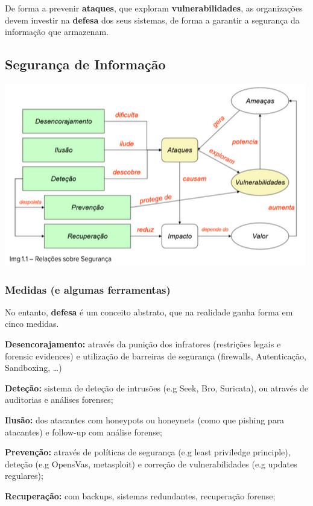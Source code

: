 \documentclass{article}
\begin{document}
  De forma a prevenir \textbf{ataques}, que exploram \textbf{vulnerabilidades}, as organizações devem investir
  na \textbf{defesa} dos seus sistemas, de forma a garantir a segurança da informação que armazenam.

  \vspace{2mm}

  \subsection{Segurança de Informação}

  \begin{center}
    \includegraphics[scale=0.4]{10}
  \end{center}

  \subsubsection{Medidas (e algumas ferramentas)}

  No entanto, \textbf{defesa} é um conceito abstrato, que na realidade ganha forma em cinco medidas.

  \begin{flushleft}
    \textbf{Desencorajamento:} através da punição dos infratores (restrições legais e forensic evidences) e utilização de barreiras de segurança
    (firewalls, Autenticação, Sandboxing, \dots)

    \vspace{2mm}

    \textbf{Deteção:} sistema de deteção de intrusões (e.g Seek, Bro, Suricata), ou através de auditorias e análises forenses;

    \vspace{2mm}

    \textbf{Ilusão:} dos atacantes com honeypots ou honeynets (como que pishing para atacantes) e follow-up com análise forense;

    \vspace{2mm}

    \textbf{Prevenção:} através de políticas de segurança (e.g least priviledge principle), deteção (e.g OpensVas, metasploit) e correção de vulnerabilidades (e.g updates regulares);

    \vspace{2mm}

    \textbf{Recuperação:} com backups, sistemas redundantes, recuperação forense;
  \end{flushleft}
\end{document}
